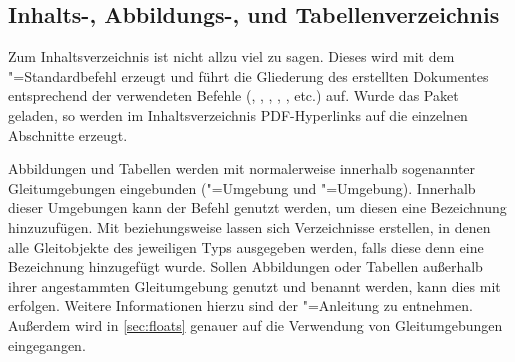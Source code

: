 \documentclass[english,ngerman]{tudscrartcl}
\begin{document}
\subsection{Inhalts-, Abbildungs-, und Tabellenverzeichnis}
Zum Inhaltsverzeichnis ist nicht allzu viel zu sagen. Dieses wird mit dem
"=Standardbefehl  erzeugt und führt die 
Gliederung des erstellten Dokumentes entsprechend der verwendeten Befehle 
(, , , , 
,  etc.) auf. Wurde das Paket  
geladen, so werden im Inhaltsverzeichnis PDF-Hyperlinks auf die einzelnen 
Abschnitte erzeugt.

Abbildungen und Tabellen werden mit  normalerweise innerhalb 
sogenannter Gleitumgebungen eingebunden ("=Umgebung und 
"=Umgebung). Innerhalb dieser Umgebungen kann der Befehl 
 genutzt 
werden, um diesen eine Bezeichnung hinzuzufügen. Mit  
beziehungsweise  lassen sich Verzeichnisse erstellen, in 
denen alle Gleitobjekte des jeweiligen Typs ausgegeben werden, falls diese denn 
eine Bezeichnung hinzugefügt wurde. Sollen Abbildungen oder Tabellen außerhalb 
ihrer angestammten Gleitumgebung genutzt und benannt werden, kann dies mit
erfolgen. Weitere Informationen hierzu sind der \KOMAScript"=Anleitung 
\scrguide zu 
entnehmen. Außerdem wird in \autoref{sec:floats} genauer auf die Verwendung von 
Gleitumgebungen eingegangen.
%
\begin{Tutorial*}
\tableofcontents
\listoffigures
\listoftables
\clearpage
\end{Tutorial*}
\end{document}
